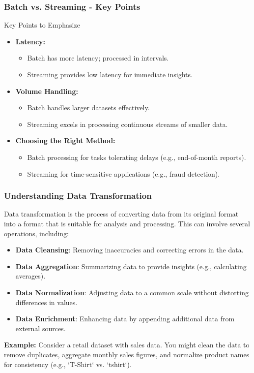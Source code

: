 \documentclass[aspectratio=169]{beamer}
\begin{document}
\begin{frame}[fragile]
    \frametitle{Batch vs. Streaming - Key Points}
    \begin{block}{Key Points to Emphasize}
        \begin{itemize}
            \item \textbf{Latency:} 
                \begin{itemize}
                    \item Batch has more latency; processed in intervals.
                    \item Streaming provides low latency for immediate insights.
                \end{itemize}
            \item \textbf{Volume Handling:} 
                \begin{itemize}
                    \item Batch handles larger datasets effectively.
                    \item Streaming excels in processing continuous streams of smaller data.
                \end{itemize}
            \item \textbf{Choosing the Right Method:}
                \begin{itemize}
                    \item Batch processing for tasks tolerating delays (e.g., end-of-month reports).
                    \item Streaming for time-sensitive applications (e.g., fraud detection).
                \end{itemize}
        \end{itemize}
    \end{block}
\end{frame}

\begin{frame}[fragile]
    \frametitle{Understanding Data Transformation}
    Data transformation is the process of converting data from its original format into a format that is suitable for analysis and processing. This can involve several operations, including:
    
    \begin{itemize}
        \item \textbf{Data Cleansing}: Removing inaccuracies and correcting errors in the data.
        \item \textbf{Data Aggregation}: Summarizing data to provide insights (e.g., calculating averages).
        \item \textbf{Data Normalization}: Adjusting data to a common scale without distorting differences in values.
        \item \textbf{Data Enrichment}: Enhancing data by appending additional data from external sources.
    \end{itemize}
    
    \textbf{Example:} Consider a retail dataset with sales data. You might clean the data to remove duplicates, aggregate monthly sales figures, and normalize product names for consistency (e.g., `T-Shirt` vs. `tshirt`).
\end{frame}
\end{document}

